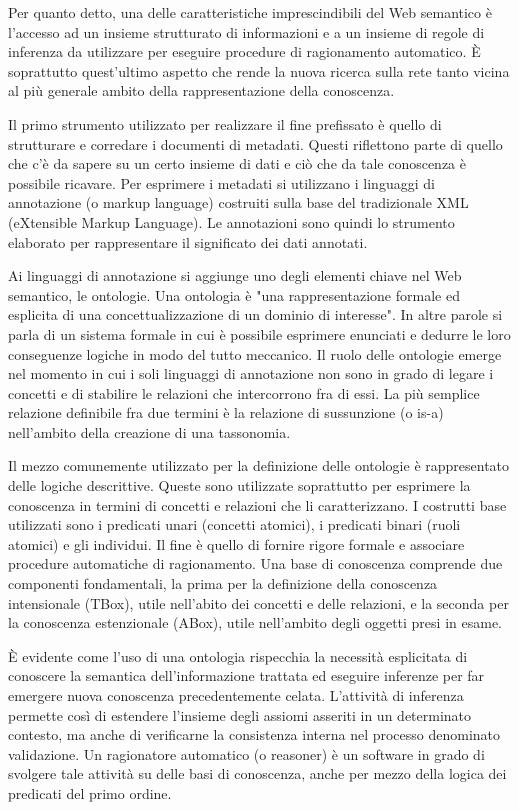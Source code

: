 \documentclass[Lau,binding=0.6cm,noexaminfo]{sapthesis}
\begin{document}
Per quanto detto, una delle caratteristiche imprescindibili del Web semantico è l'accesso ad un insieme strutturato di informazioni e a un insieme di regole di inferenza da utilizzare per eseguire procedure di ragionamento automatico.
\MakeUppercase{è} soprattutto quest'ultimo aspetto che rende la nuova ricerca sulla rete tanto vicina al più generale ambito della rappresentazione della conoscenza.\medskip

Il primo strumento utilizzato per realizzare il fine prefissato è quello di strutturare e corredare i documenti di metadati. Questi riflettono parte di quello che c'è da sapere su un certo insieme di dati e ciò che da tale conoscenza è possibile ricavare.
Per esprimere i metadati si utilizzano i linguaggi di annotazione (o markup language) costruiti sulla base del tradizionale XML (eXtensible Markup Language). Le annotazioni sono quindi lo strumento elaborato per rappresentare il significato dei dati annotati.\medskip

Ai linguaggi di annotazione si aggiunge uno degli elementi chiave nel Web semantico, le ontologie. Una ontologia è "una rappresentazione formale ed esplicita di una concettualizzazione di un dominio di interesse". In altre parole si parla di un sistema formale in cui è possibile esprimere enunciati e dedurre le loro conseguenze logiche in modo del tutto meccanico.
Il ruolo delle ontologie emerge nel momento in cui i soli linguaggi di annotazione non sono in grado di legare i concetti e di stabilire le relazioni che intercorrono fra di essi. La più semplice relazione definibile fra due termini è la relazione di sussunzione (o is-a) nell'ambito della creazione di una tassonomia.\medskip

Il mezzo comunemente utilizzato per la definizione delle ontologie è rappresentato delle logiche descrittive. Queste sono utilizzate soprattutto per esprimere la conoscenza in termini di concetti e relazioni che li caratterizzano. I costrutti base utilizzati sono i predicati unari (concetti atomici), i predicati binari (ruoli atomici) e gli individui.
Il fine è quello di fornire rigore formale e associare procedure automatiche di ragionamento. Una base di conoscenza comprende due componenti fondamentali, la prima per la definizione della conoscenza intensionale (TBox), utile nell'abito dei concetti e delle relazioni, e la seconda per la conoscenza estenzionale (ABox), utile nell'ambito degli oggetti presi in esame.\medskip

\MakeUppercase{è} evidente come l'uso di una ontologia rispecchia la necessità esplicitata di conoscere la semantica dell'informazione trattata ed eseguire inferenze per far emergere nuova conoscenza precedentemente celata.
L'attività di inferenza permette così di estendere l'insieme degli assiomi asseriti in un determinato contesto, ma anche di verificarne la consistenza interna nel processo denominato validazione. Un ragionatore automatico (o reasoner) è un software in grado di svolgere tale attività su delle basi di conoscenza, anche per mezzo della logica dei predicati del primo ordine.\medskip
\end{document}
